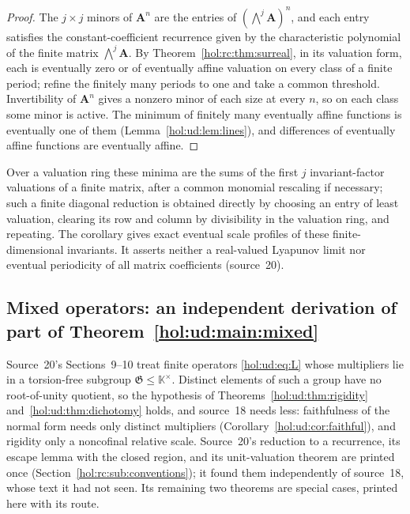 \documentclass[11pt]{article}
\numberwithin{equation}{section}
\theoremstyle{definition}
\theoremstyle{remark}
\newcommand{\KK}{\mathbb K}
\begin{document}
\begin{proof}
The $j\times j$ minors of $\mathbf A^n$ are the entries of
$(\bigwedge^j\mathbf A)^n$, and each entry satisfies the constant-coefficient
recurrence given by the characteristic polynomial of the finite matrix
$\bigwedge^j\mathbf A$. By Theorem~\ref{hol:rc:thm:surreal}, in its valuation
form, each is eventually zero or of eventually affine valuation on every class
of a finite period; refine the finitely many periods to one and take a common
threshold. Invertibility of $\mathbf A^n$ gives a nonzero minor of each size at
every $n$, so on each class some minor is active. The minimum of finitely many
eventually affine functions is eventually one of them
(Lemma~\ref{hol:ud:lem:lines}), and differences of eventually affine functions
are eventually affine.
\end{proof}

Over a valuation ring these minima are the sums of the first $j$ invariant-factor
valuations of a finite matrix, after a common monomial rescaling if
necessary; such a finite diagonal reduction is obtained directly by choosing
an entry of least valuation, clearing its row and column by divisibility in
the valuation ring, and repeating. The corollary gives exact eventual scale
profiles of these finite-dimensional invariants. It asserts neither a
real-valued Lyapunov limit nor eventual periodicity of all matrix
coefficients (source~20).

\subsection{Mixed operators: an independent derivation of part of
Theorem~\ref{hol:ud:main:mixed}}\label{hol:rc:sub:mixed}

Source~20's Sections~9--10 treat finite operators \eqref{hol:ud:eq:L} whose
multipliers lie in a torsion-free subgroup $\mathfrak G\le\KK^\times$. Distinct
elements of such a group have no root-of-unity quotient, so the hypothesis of
Theorems~\ref{hol:ud:thm:rigidity} and~\ref{hol:ud:thm:dichotomy} holds, and
source~18 needs less: faithfulness of the normal form needs only distinct
multipliers (Corollary~\ref{hol:ud:cor:faithful}), and rigidity only a
noncofinal relative scale. Source~20's reduction to a recurrence, its escape
lemma with the closed region, and its unit-valuation theorem are printed once
(Section~\ref{hol:rc:sub:conventions}); it found them independently of
source~18, whose text it had not seen. Its remaining two theorems are special
cases, printed here with its route.
\end{document}
